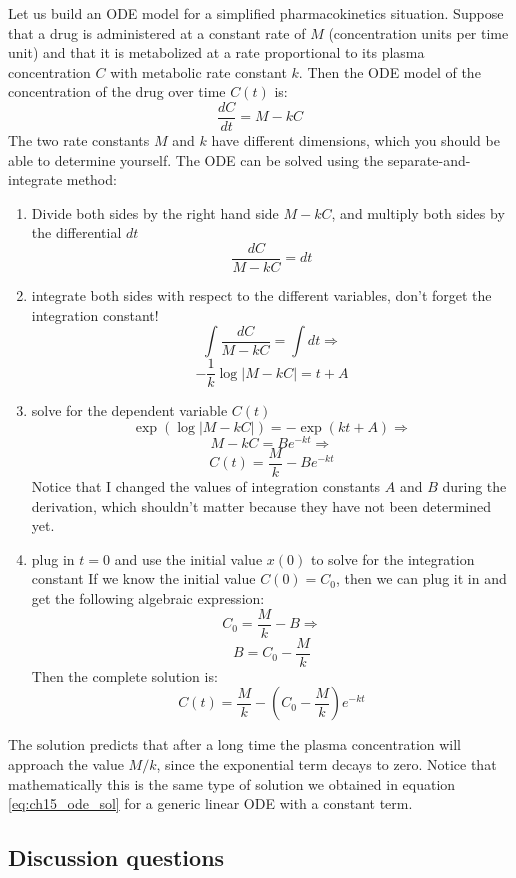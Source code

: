 \documentclass[
  letterpaper,
  DIV=11,
  numbers=noendperiod]{scrreprt}
\providecommand{\tightlist}{%
  \setlength{\itemsep}{0pt}\setlength{\parskip}{0pt}}\usepackage{longtable,booktabs,array}
\begin{document}
Let us build an ODE model for a simplified pharmacokinetics situation.
Suppose that a drug is administered at a constant rate of \(M\)
(concentration units per time unit) and that it is metabolized at a rate
proportional to its plasma concentration \(C\) with metabolic rate
constant \(k\). Then the ODE model of the concentration of the drug over
time \(C(t)\) is: \[ \frac{dC}{dt} = M - kC\] The two rate constants
\(M\) and \(k\) have different dimensions, which you should be able to
determine yourself. The ODE can be solved using the
separate-and-integrate method:

\begin{enumerate}
\def\labelenumi{\arabic{enumi}.}
\tightlist
\item
  Divide both sides by the right hand side \(M-kC\), and multiply both
  sides by the differential \(dt\) \[ \frac{dC}{M-kC} = dt\]
\item
  integrate both sides with respect to the different variables, don't
  forget the integration constant!
  \[ \int \frac{dC}{M-kC} = \int dt \Rightarrow\]
  \[ -\frac{1}{k} \log |M-kC| = t + A\]
\item
  solve for the dependent variable \(C(t)\)
  \[ \exp(\log |M-kC| ) = -\exp(kt +A) \Rightarrow \]
  \[  M - kC = B e^{-kt} \Rightarrow \]
  \[ C(t) = \frac{M}{k}- Be^{-kt}\] Notice that I changed the values of
  integration constants \(A\) and \(B\) during the derivation, which
  shouldn't matter because they have not been determined yet.
\item
  plug in \(t=0\) and use the initial value \(x(0)\) to solve for the
  integration constant If we know the initial value \(C(0) = C_0\), then
  we can plug it in and get the following algebraic expression:
  \[ C_0 =  \frac{M}{k} - B \Rightarrow \] \[ B = C_0 -  \frac{M}{k}\]
  Then the complete solution is:
  \[ C(t) =  \frac{M}{k} - (C_0- \frac{M}{k})e^{-kt}\]
\end{enumerate}

The solution predicts that after a long time the plasma concentration
will approach the value \(M/k\), since the exponential term decays to
zero. Notice that mathematically this is the same type of solution we
obtained in equation \ref{eq:ch15_ode_sol} for a generic linear ODE with
a constant term.

\hypertarget{discussion-questions-3}{%
\subsection{Discussion questions}\label{discussion-questions-3}}
\end{document}
